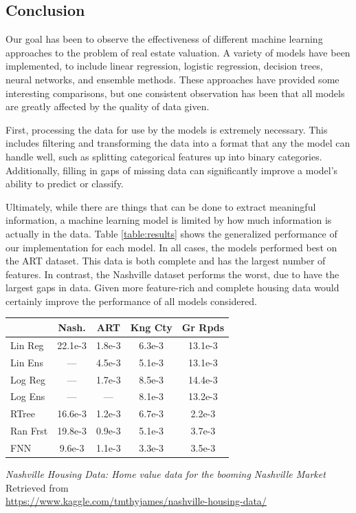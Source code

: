 \documentclass[10pt]{article}
\begin{document}
\begin{multicols}{2}
 		\section{Conclusion}
 		Our goal has been to observe the effectiveness of different machine learning approaches to the problem of real estate valuation. A variety of models have been implemented, to include linear regression, logistic regression, decision trees, neural networks, and ensemble methods. These approaches have provided some interesting comparisons, but one consistent observation has been that all models are greatly affected by the quality of data given.

		First, processing the data for use by the models is extremely necessary. This includes filtering and transforming the data into a format that any the model can handle well, such as splitting categorical features up into binary categories. Additionally, filling in gaps of missing data can significantly improve a model's ability to predict or classify.

		Ultimately, while there are things that can be done to extract meaningful information, a machine learning model is limited by how much information is actually in the data.  Table \ref{table:results} shows the generalized performance of our implementation for each model.  In all cases, the models performed best on the ART dataset.  This data is both complete and has the largest number of features.  In contrast, the Nashville dataset performs the worst, due to have the largest gaps in data. Given more feature-rich and complete housing data would certainly improve the performance of all models considered.
		
		\begin{center}
	        \captionsetup{type=table}
	        \begin{tabular}{l|c|c|c|c}
	        	         & Nash.   & ART     & Kng Cty & Gr Rpds \\
	        	\hline
	        	Lin Reg  & 22.1e-3 & 1.8e-3  & 6.3e-3  & 13.1e-3 \\
	        	Lin Ens  & ---     & 4.5e-3  & 5.1e-3  & 13.1e-3 \\
	        	Log Reg  & ---     & 1.7e-3  & 8.5e-3  & 14.4e-3 \\
	        	Log Ens  & ---     & ---     & 8.1e-3  & 13.2e-3 \\
	        	RTree  	 & 16.6e-3 & 1.2e-3	 & 6.7e-3  & 2.2e-3  \\
	        	Ran Frst & 19.8e-3 & 0.9e-3  & 5.1e-3  & 3.7e-3  \\
	        	FNN      & 9.6e-3  & 1.1e-3  & 3.3e-3  & 3.5e-3  \\	        	
	        \end{tabular}
			\label{table:results}
		\end{center}
		\begin{thebibliography}{13}
			\textit{Nashville Housing Data: Home value data for the booming Nashville Market}
			Retrieved from \\ \small{\url{https://www.kaggle.com/tmthyjames/nashville-housing-data/}}
			

\end{thebibliography}
\end{multicols}
\end{document}
